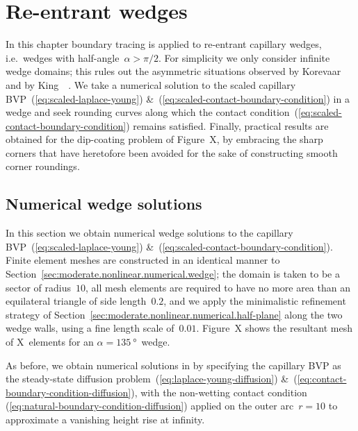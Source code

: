 \chapter{Re-entrant wedges}
\label{ch:re-entrant}

In this chapter
boundary tracing is applied to re-entrant capillary wedges,
i.e.~wedges with half-angle~$\alpha > \pi/2$.
For simplicity we only consider infinite wedge domains;
this rules out the asymmetric situations observed by
Korevaar~\cite{korevaar-1980-capillary-re-entrant-corner}
and by King~\etal~\cite{king-1999-laplace-young-near-corner}.
We take a numerical solution to
the scaled capillary BVP~(\ref{eq:scaled-laplace-young})
\&~(\ref{eq:scaled-contact-boundary-condition})
in a wedge
and seek rounding curves along which
the contact condition~(\ref{eq:scaled-contact-boundary-condition})
remains satisfied.
Finally, practical results are obtained for the dip-coating problem
of Figure~X, %
by embracing the sharp corners
that have heretofore been avoided
for the sake of constructing smooth corner roundings.

\section{Numerical wedge solutions}
\label{sec:re-entrant.numerical}

In this section we obtain numerical wedge solutions
to the capillary BVP~(\ref{eq:scaled-laplace-young})
\&~(\ref{eq:scaled-contact-boundary-condition}).
Finite element meshes are constructed in an identical manner
to Section~\ref{sec:moderate.nonlinear.numerical.wedge};
the domain is taken to be a sector of radius~$10$,
all mesh elements are required to have no more area
than an equilateral triangle of side length~$0.2$,
and we apply the minimalistic refinement strategy
of Section~\ref{sec:moderate.nonlinear.numerical.half-plane}
along the two wedge walls,
using a fine length scale of~$0.01$.
Figure~X %
shows the resultant mesh of X~elements
for an $\alpha = \SI{135}{\degree}$~wedge.

As before, we obtain numerical solutions in 
by specifying the capillary BVP
as the steady-state diffusion problem~(\ref{eq:laplace-young-diffusion})
\&~(\ref{eq:contact-boundary-condition-diffusion}),
with the non-wetting contact condition~%
  (\ref{eq:natural-boundary-condition-diffusion})
applied on the outer arc~$r = 10$
to approximate a vanishing height rise at infinity.

